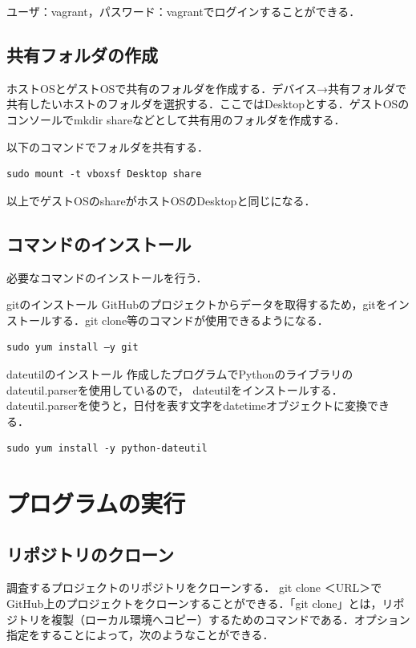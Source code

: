 ユーザ：vagrant，パスワード：vagrantでログインすることができる．

\subsection{共有フォルダの作成}
ホストOSとゲストOSで共有のフォルダを作成する．デバイス→共有フォルダで共有したいホストのフォルダを選択する．ここではDesktopとする．ゲストOSのコンソールでmkdir shareなどとして共有用のフォルダを作成する．

以下のコマンドでフォルダを共有する．
\begin{lstlisting}[basicstyle=\ttfamily\footnotesize, frame=single]
sudo mount -t vboxsf Desktop share
\end{lstlisting}
\hfil

以上でゲストOSのshareがホストOSのDesktopと同じになる．

\newpage

\subsection{コマンドのインストール}
必要なコマンドのインストールを行う．

gitのインストール
GitHubのプロジェクトからデータを取得するため，gitをインストールする．git clone等のコマンドが使用できるようになる．
\begin{lstlisting}[basicstyle=\ttfamily\footnotesize, frame=single]
sudo yum install –y git
\end{lstlisting}
\hfil

dateutilのインストール
作成したプログラムでPythonのライブラリのdateutil.parserを使用しているので， dateutilをインストールする．dateutil.parserを使うと，日付を表す文字をdatetimeオブジェクトに変換できる．
\begin{lstlisting}[basicstyle=\ttfamily\footnotesize, frame=single]
sudo yum install -y python-dateutil
\end{lstlisting}


\section{プログラムの実行}

\subsection{リポジトリのクローン}
調査するプロジェクトのリポジトリをクローンする．
git clone ＜URL＞でGitHub上のプロジェクトをクローンすることができる．「git clone」とは，リポジトリを複製（ローカル環境へコピー）するためのコマンドである．オプション指定をすることによって，次のようなことができる．

